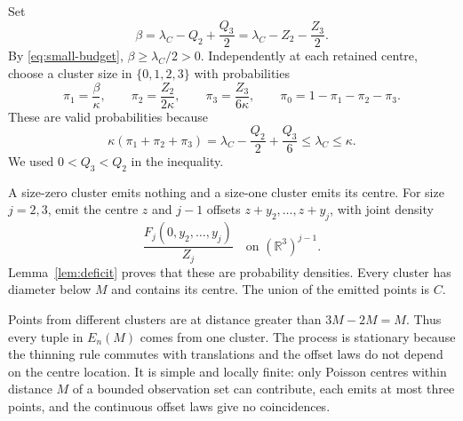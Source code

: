 \documentclass[11pt,a4paper]{article}
\numberwithin{equation}{section}
\theoremstyle{definition}
\theoremstyle{remark}
\newcommand{\R}{\mathbb R}
\begin{document}
Set
\begin{equation}
 \beta=\lambda_C-Q_2+\frac{Q_3}{2}
       =\lambda_C-Z_2-\frac{Z_3}{2}.
 \label{eq:beta}
\end{equation}
By \eqref{eq:small-budget}, $\beta\geq\lambda_C/2>0$.
Independently at each retained centre, choose a cluster size in
$\{0,1,2,3\}$ with probabilities
\begin{equation}
 \pi_1=\frac\beta\kappa,\qquad
 \pi_2=\frac{Z_2}{2\kappa},\qquad
 \pi_3=\frac{Z_3}{6\kappa},\qquad
 \pi_0=1-\pi_1-\pi_2-\pi_3.
 \label{eq:cluster-probabilities}
\end{equation}
These are valid probabilities because
\begin{equation}
 \kappa(\pi_1+\pi_2+\pi_3)
 =\lambda_C-\frac{Q_2}{2}+\frac{Q_3}{6}
 \leq\lambda_C\leq\kappa.
 \label{eq:cluster-budget}
\end{equation}
We used $0<Q_3<Q_2$ in the inequality.

A size-zero cluster emits nothing and a size-one cluster emits its centre.
For size $j=2,3$, emit the centre $z$ and $j-1$ offsets
$z+y_2,\ldots,z+y_j$, with joint density
\begin{equation}
 \frac{F_j(0,y_2,\ldots,y_j)}{Z_j}
 \quad\text{on }(\R^3)^{j-1}.
 \label{eq:offset-law}
\end{equation}
Lemma~\ref{lem:deficit} proves that these are probability densities.
Every cluster has diameter below $M$ and contains its centre. The union
of the emitted points is $C$.

Points from different clusters are at distance greater than
$3M-2M=M$. Thus every tuple in $E_n(M)$ comes from one cluster. The
process is stationary because the thinning rule commutes with
translations and the offset laws do not depend on the centre location.
It is simple and locally finite: only Poisson centres within distance
$M$ of a bounded observation set can contribute, each emits at most
three points, and the continuous offset laws give no coincidences.
\end{document}
